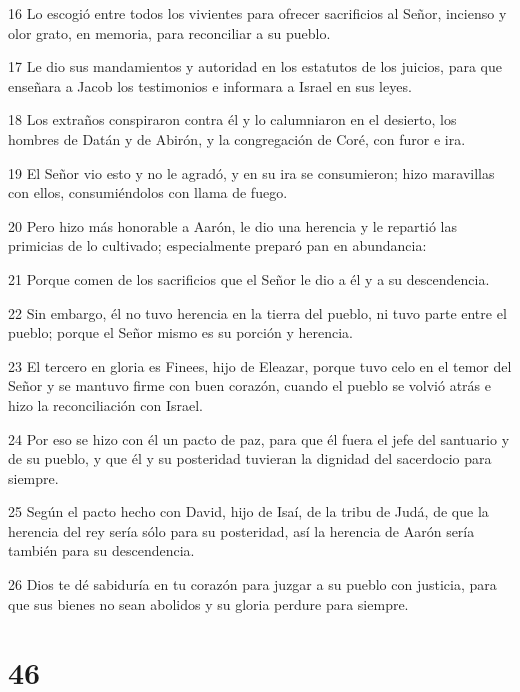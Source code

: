 \par 16 Lo escogió entre todos los vivientes para ofrecer sacrificios al Señor, incienso y olor grato, en memoria, para reconciliar a su pueblo.
\par 17 Le dio sus mandamientos y autoridad en los estatutos de los juicios, para que enseñara a Jacob los testimonios e informara a Israel en sus leyes.
\par 18 Los extraños conspiraron contra él y lo calumniaron en el desierto, los hombres de Datán y de Abirón, y la congregación de Coré, con furor e ira.
\par 19 El Señor vio esto y no le agradó, y en su ira se consumieron; hizo maravillas con ellos, consumiéndolos con llama de fuego.
\par 20 Pero hizo más honorable a Aarón, le dio una herencia y le repartió las primicias de lo cultivado; especialmente preparó pan en abundancia:
\par 21 Porque comen de los sacrificios que el Señor le dio a él y a su descendencia.
\par 22 Sin embargo, él no tuvo herencia en la tierra del pueblo, ni tuvo parte entre el pueblo; porque el Señor mismo es su porción y herencia.
\par 23 El tercero en gloria es Finees, hijo de Eleazar, porque tuvo celo en el temor del Señor y se mantuvo firme con buen corazón, cuando el pueblo se volvió atrás e hizo la reconciliación con Israel.
\par 24 Por eso se hizo con él un pacto de paz, para que él fuera el jefe del santuario y de su pueblo, y que él y su posteridad tuvieran la dignidad del sacerdocio para siempre.
\par 25 Según el pacto hecho con David, hijo de Isaí, de la tribu de Judá, de que la herencia del rey sería sólo para su posteridad, así la herencia de Aarón sería también para su descendencia.
\par 26 Dios te dé sabiduría en tu corazón para juzgar a su pueblo con justicia, para que sus bienes no sean abolidos y su gloria perdure para siempre.

\chapter{46}

